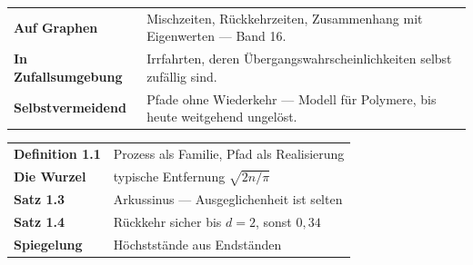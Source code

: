\begin{forschung}
\begin{center}
{\small
\renewcommand{\arraystretch}{1.45}
\begin{tabular}{@{}P{3.0cm}P{5.2cm}@{}}
\toprule
\textbf{Auf Graphen} & Mischzeiten, Rückkehrzeiten, Zusammenhang mit Eigenwerten --- Band 16.\\
\textbf{In Zufallsumgebung} & Irrfahrten, deren Übergangswahrscheinlichkeiten selbst zufällig sind.\\
\textbf{Selbstvermeidend} & Pfade ohne Wiederkehr --- Modell für Polymere, bis heute weitgehend ungelöst.\\
\bottomrule
\end{tabular}}
\end{center}

\begin{center}
\begin{minipage}{0.88\textwidth}
\end{minipage}
\end{center}
\end{forschung}

\begin{merksatz}
\begin{center}
\renewcommand{\arraystretch}{1.5}
\begin{tabular}{@{}P{3.0cm}P{5.6cm}@{}}
\toprule
\textbf{Definition 1.1} & Prozess als Familie, Pfad als Realisierung\\
\textbf{Die Wurzel} & typische Entfernung $\sqrt{2n/\pi}$\\
\textbf{Satz 1.3} & Arkussinus --- Ausgeglichenheit ist selten\\
\textbf{Satz 1.4} & Rückkehr sicher bis $d=2$, sonst $0{,}34$\\
\textbf{Spiegelung} & Höchststände aus Endständen\\
\bottomrule
\end{tabular}
\end{center}

\begin{center}
\begin{minipage}{0.88\textwidth}
\end{minipage}
\end{center}
\end{merksatz}
